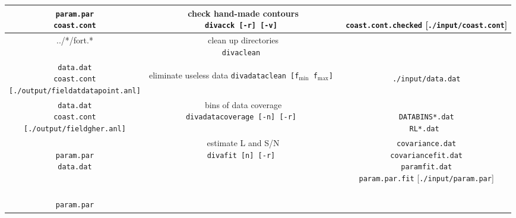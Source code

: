 \begin{table}[H]
{{\begin{tabular}{c|c|c}
 \shortstack{
{\tt param.par} \\
{\tt coast.cont} 
}
 & 
\shortstack{
{\sf check hand-made contours} \\
{\tt divacck [-r] [-v]  } 
\\
{  { }  }
}
& 
\shortstack{
{  { }  } \\
{\tt coast.cont.checked}  { } [{\tt ./input/coast.cont}] \\
{  { }  }
}
 \\ \hline
 ../*/fort.*
 & 
 \shortstack{
 {\sf clean up directories} \\
{\tt divaclean  } 
}
& 
 { }
 \\ \hline
 \shortstack{
{\tt data.dat} \\
{\tt coast.cont} \\
{\tt [./output/fieldatdatapoint.anl]} 
}
 & 
\shortstack{
{\sf eliminate useless data} \\
{\tt divadataclean  [f$_{\min}$  f$_{\max}$]  } 
\\
{  { }  }
}
& 
\shortstack{
{  { }  } \\
{\tt ./input/data.dat} \\
{  { }  }
}
 \\ \hline
 \shortstack{
{\tt data.dat} \\
{\tt coast.cont} \\
{\tt [./output/fieldgher.anl]} 
}
 & 
\shortstack{
{\sf bins of data coverage} \\
{\tt divadatacoverage  [-n] [-r]  } 
\\
{  { }  }
}
& 
\shortstack{
{  { }  } \\
{\tt DATABINS*.dat} \\
{  {\tt RL*.dat }  }
}
 \\ \hline
 \shortstack{
 {  { }  } \\
{\tt param.par} \\
{\tt data.dat} \\
{  { }  } 
}
 & 
\shortstack{
{\sf estimate L and S/N} \\
{\tt divafit [n] [-r]  } 
\\
{  { }  } \\
{  { }  }
}
& 
\shortstack{
{\tt covariance.dat} \\
{\tt covariancefit.dat} \\
{\tt paramfit.dat} \\
{\tt param.par.fit} {  { }  } [{\tt ./input/param.par}]
}
\\ \hline
 \shortstack{
 {  { }  } \\
{\tt param.par} \\
}
\end{tabular}}}
\end{table}
